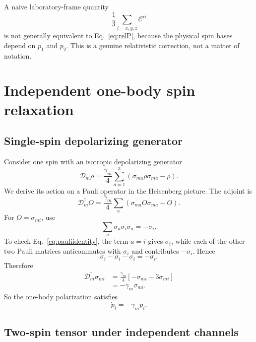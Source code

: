 \documentclass[11pt]{article}
\newcommand{\Ccal}{\mathcal C}
\newcommand{\Dcal}{\mathcal D}
\begin{document}
A naive laboratory-frame quantity
\begin{equation}
\frac13\sum_{i=x,y,z}\Ccal^{ii}
\end{equation}
is not generally equivalent to Eq.~\eqref{eq:relP}, because the physical spin bases depend on $p_1$ and $p_2$. This is a genuine relativistic correction, not a matter of notation.

\section{Independent one-body spin relaxation}

\subsection{Single-spin depolarizing generator}

Consider one spin with an isotropic depolarizing generator
\begin{equation}
\Dcal_m\rho
=\frac{\gamma_m}{4}\sum_{a=1}^{3}
(\sigma_{ma}\rho\sigma_{ma}-\rho).
\label{eq:depgen}
\end{equation}
We derive its action on a Pauli operator in the Heisenberg picture. The adjoint is
\begin{equation}
\Dcal_m^\dagger O
=\frac{\gamma_m}{4}\sum_a
(\sigma_{ma}O\sigma_{ma}-O).
\end{equation}
For $O=\sigma_{mi}$, use
\begin{equation}
\sum_a\sigma_a\sigma_i\sigma_a=-\sigma_i.
\label{eq:pauliidentity}
\end{equation}
To check Eq.~\eqref{eq:pauliidentity}, the term $a=i$ gives $\sigma_i$, while each of the other two Pauli matrices anticommutes with $\sigma_i$ and contributes $-\sigma_i$. Hence
\begin{equation}
\sigma_i-\sigma_i-\sigma_i=-\sigma_i.
\end{equation}
Therefore
\begin{align}
\Dcal_m^\dagger\sigma_{mi}
&=\frac{\gamma_m}{4}\left[-\sigma_{mi}-3\sigma_{mi}\right]\\
&=-\gamma_m\sigma_{mi}.
\end{align}
So the one-body polarization satisfies
\begin{equation}
\dot p_i=-\gamma_m p_i.
\end{equation}

\subsection{Two-spin tensor under independent channels}
\end{document}
